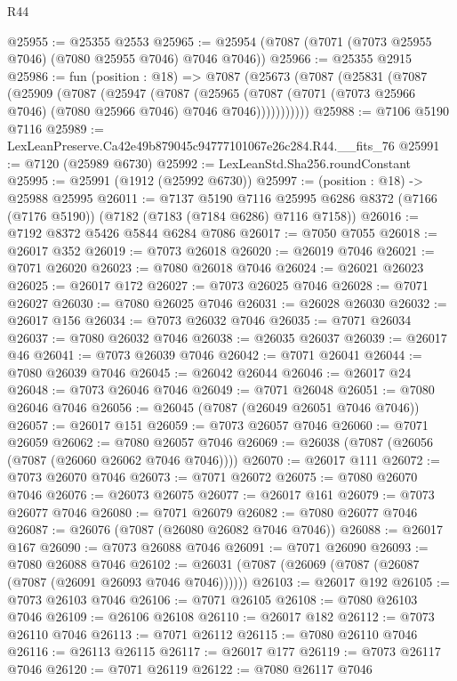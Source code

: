\begin{lexlean}{R44}
\begin{coremodule}
{@25955 := @25355 @2553
@25965 := @25954 (@7087 (@7071 (@7073 @25955 @7046) (@7080 @25955 @7046) @7046 @7046))
@25966 := @25355 @2915
@25986 := fun (position : @18) =>
  @7087
    (@25673
      (@7087
        (@25831
          (@7087
            (@25909
              (@7087
                (@25947
                  (@7087
                    (@25965
                      (@7087 (@7071 (@7073 @25966 @7046) (@7080 @25966 @7046) @7046 @7046)))))))))))
@25988 := @7106 @5190 @7116
@25989 := LexLeanPreserve.Ca42e49b879045c94777101067e26c284.R44.__fits_76
@25991 := @7120 (@25989 @6730)
@25992 := LexLeanStd.Sha256.roundConstant
@25995 := @25991 (@1912 (@25992 @6730))
@25997 := (position : @18) -> @25988 @25995
@26011 := @7137
    @5190
    @7116
    @25995
    @6286
    @8372
    (@7166 (@7176 @5190))
    (@7182 (@7183 (@7184 @6286) @7116 @7158))
@26016 := @7192 @8372 @5426 @5844 @6284 @7086
@26017 := @7050 @7055
@26018 := @26017 @352
@26019 := @7073 @26018
@26020 := @26019 @7046
@26021 := @7071 @26020
@26023 := @7080 @26018 @7046
@26024 := @26021 @26023
@26025 := @26017 @172
@26027 := @7073 @26025 @7046
@26028 := @7071 @26027
@26030 := @7080 @26025 @7046
@26031 := @26028 @26030
@26032 := @26017 @156
@26034 := @7073 @26032 @7046
@26035 := @7071 @26034
@26037 := @7080 @26032 @7046
@26038 := @26035 @26037
@26039 := @26017 @46
@26041 := @7073 @26039 @7046
@26042 := @7071 @26041
@26044 := @7080 @26039 @7046
@26045 := @26042 @26044
@26046 := @26017 @24
@26048 := @7073 @26046 @7046
@26049 := @7071 @26048
@26051 := @7080 @26046 @7046
@26056 := @26045 (@7087 (@26049 @26051 @7046 @7046))
@26057 := @26017 @151
@26059 := @7073 @26057 @7046
@26060 := @7071 @26059
@26062 := @7080 @26057 @7046
@26069 := @26038 (@7087 (@26056 (@7087 (@26060 @26062 @7046 @7046))))
@26070 := @26017 @111
@26072 := @7073 @26070 @7046
@26073 := @7071 @26072
@26075 := @7080 @26070 @7046
@26076 := @26073 @26075
@26077 := @26017 @161
@26079 := @7073 @26077 @7046
@26080 := @7071 @26079
@26082 := @7080 @26077 @7046
@26087 := @26076 (@7087 (@26080 @26082 @7046 @7046))
@26088 := @26017 @167
@26090 := @7073 @26088 @7046
@26091 := @7071 @26090
@26093 := @7080 @26088 @7046
@26102 := @26031 (@7087 (@26069 (@7087 (@26087 (@7087 (@26091 @26093 @7046 @7046))))))
@26103 := @26017 @192
@26105 := @7073 @26103 @7046
@26106 := @7071 @26105
@26108 := @7080 @26103 @7046
@26109 := @26106 @26108
@26110 := @26017 @182
@26112 := @7073 @26110 @7046
@26113 := @7071 @26112
@26115 := @7080 @26110 @7046
@26116 := @26113 @26115
@26117 := @26017 @177
@26119 := @7073 @26117 @7046
@26120 := @7071 @26119
@26122 := @7080 @26117 @7046
}
\end{coremodule}
\end{lexlean}
